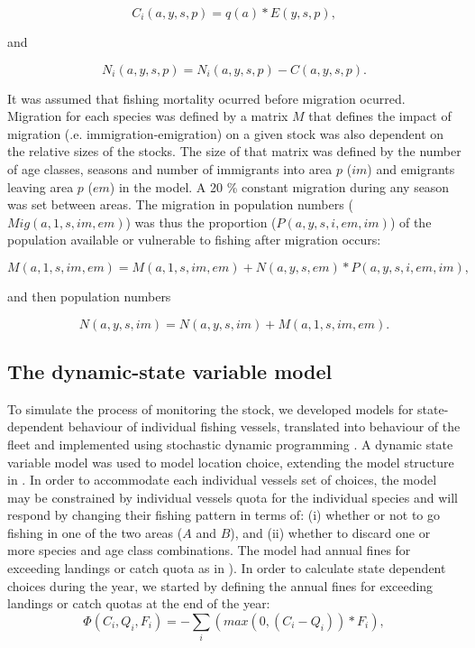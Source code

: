 \documentclass[12pt,oneline,a4paper,numbib]{ouparticle}
\numberwithin{equation}{subsection} %
\begin{document}
\begin{equation}
C_i (a, y, s, p) = q(a) * E(y,s,p),
\end{equation}

and 

\begin{equation}
N_i (a, y, s, p) = N_i (a, y, s, p) - C (a, y, s, p). 
\end{equation}

It was assumed that fishing mortality ocurred before migration ocurred. Migration for each species was defined by a matrix $M$ that defines the impact of migration (.e. immigration-emigration) on a given stock was also dependent on the relative sizes of the stocks. The size of that matrix  was defined by the number of age classes, seasons and number of immigrants into area $p$ ($im$) and emigrants leaving area $p$ ($em$) in the model. A 20 \% constant migration during any season was set between areas. The migration in population numbers ($Mig (a, 1, s, im, em)$) was thus the proportion ($P (a, y, s, i, em, im)$) of the population available or vulnerable to fishing after migration occurs:   

\begin{equation}
M (a, 1, s, im, em) = M (a, 1, s, im, em) + N (a, y, s, em) * P (a, y, s, i, em, im),
\end{equation}

and then population numbers

\begin{equation}
N (a, y, s, im) = N (a, y, s, im) +  M (a, 1, s, im, em).
\end{equation}


\subsection{The dynamic-state variable model}
\label{sec2.2}

To simulate the process of monitoring the stock, we developed models for state-dependent behaviour of individual fishing vessels, translated into behaviour of the fleet and implemented using stochastic dynamic programming \cite{Alzorriz2018, Batsleer2015, ClarkandMangel2000, Dowling2011, Houston1999, Poos2010}. A dynamic state variable model \cite{ClarkandMangel2000, Houston1999} was used to model location choice, extending the model structure in \cite{Batsleer2015}. In order to accommodate each individual vessels set of choices, the model may be constrained by individual vessels quota for the individual species and will respond by changing their fishing pattern in terms of: (i) whether or not to go fishing in one of the two areas ($A$ and $B$), and (ii) whether to discard one or more species and age class combinations. The model had annual fines for exceeding landings or catch quota as in \cite{Alzorriz2018}). In order to calculate state dependent choices during the year, we started by defining the annual fines for exceeding landings or catch quotas at the end of the year:
\begin{equation}
\Phi (C_i, Q_i, F_i)= -\sum_i (max( 0, (C_i - Q_i))* F_i),
\end{equation}
\end{document}
